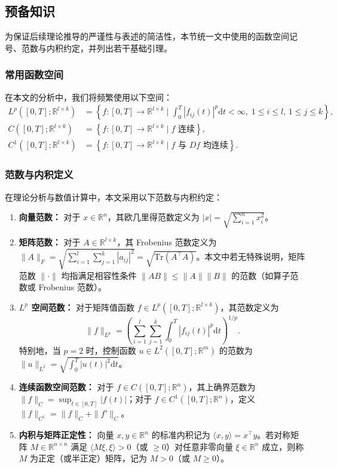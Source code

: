 \documentclass{GZUbachelorthesis}
\begin{document}
\subsection{预备知识}
为保证后续理论推导的严谨性与表述的简洁性，本节统一文中使用的函数空间记号、范数与内积约定，并列出若干基础引理。

\subsubsection*{常用函数空间}
在本文的分析中，我们将频繁使用以下空间：
\begin{align*}
	L^p([0,T];\mathbb{R}^{l\times k}) &= \left\{ f:[0,T]\to\mathbb{R}^{l\times k} \;\bigg|\; \int_0^T |f_{ij}(t)|^p \mathrm{d}t < \infty,\; 1\le i\le l,\,1\le j\le k \right\}, \\
	C([0,T];\mathbb{R}^{l\times k}) &= \left\{ f:[0,T]\to\mathbb{R}^{l\times k} \;\big|\; f \text{ 连续} \right\}, \\
	C^1([0,T];\mathbb{R}^{l\times k}) &= \left\{ f:[0,T]\to\mathbb{R}^{l\times k} \;\big|\; f \text{ 与 } Df \text{ 均连续} \right\}.
\end{align*}

\subsubsection*{范数与内积定义}
在理论分析与数值计算中，本文采用以下范数与内积约定：
\begin{enumerate}
	\item \textbf{向量范数：} 对于 $x \in \mathbb{R}^n$，其欧几里得范数定义为 $|x| = \sqrt{\sum_{i=1}^{n} x_i^2}$。
	
	\item \textbf{矩阵范数：} 对于 $A \in \mathbb{R}^{l \times k}$，其 Frobenius 范数定义为 $\|A\|_F = \sqrt{\sum_{i=1}^{l} \sum_{j=1}^{k} |a_{ij}|^2} = \sqrt{\mathrm{Tr}(A^\top A)}$。本文中若无特殊说明，矩阵范数 $\|\cdot\|$ 均指满足相容性条件 $\|AB\| \le \|A\|\|B\|$ 的范数（如算子范数或 Frobenius 范数）。
	
	\item \textbf{$L^p$ 空间范数：} 对于矩阵值函数 $f \in L^p([0,T];\mathbb{R}^{l\times k})$，其范数定义为
	\[ \|f\|_{L^p} = \left( \sum_{i=1}^{l} \sum_{j=1}^{k} \int_0^T |f_{ij}(t)|^p \mathrm{d}t \right)^{1/p}. \]
	特别地，当 $p=2$ 时，控制函数 $u \in L^2([0,T];\mathbb{R}^m)$ 的范数为 $\|u\|_{L^2} = \sqrt{\int_0^T |u(t)|^2 \mathrm{d}t}$。
	
	\item \textbf{连续函数空间范数：} 对于 $f \in C([0,T];\mathbb{R}^n)$，其上确界范数为 $\|f\|_{C} = \sup_{t \in [0,T]} |f(t)|$；对于 $f \in C^1([0,T];\mathbb{R}^n)$，定义 $\|f\|_{C^1} = \|f\|_C + \|f'\|_C$。
	
	\item \textbf{内积与矩阵正定性：} 向量 $x, y \in \mathbb{R}^n$ 的标准内积记为 $\langle x, y \rangle = x^\top y$。若对称矩阵 $M \in \mathbb{R}^{n \times n}$ 满足 $\langle M\xi, \xi \rangle > 0$（或 $\ge 0$）对任意非零向量 $\xi \in \mathbb{R}^n$ 成立，则称 $M$ 为正定（或半正定）矩阵，记为 $M > 0$（或 $M \ge 0$）。
	
\end{enumerate}
\end{document}
